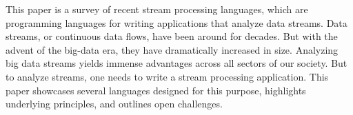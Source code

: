 This paper is a survey of recent stream processing languages, which
are programming languages for writing applications that analyze data
streams. Data streams, or continuous data flows, have been around for
decades. But with the advent of the big-data era, they have
dramatically increased in size. Analyzing big data streams yields
immense advantages across all sectors of our society. But to analyze
streams, one needs to write a stream processing application. This
paper showcases several languages designed for this purpose,
highlights underlying principles, and outlines open challenges.
